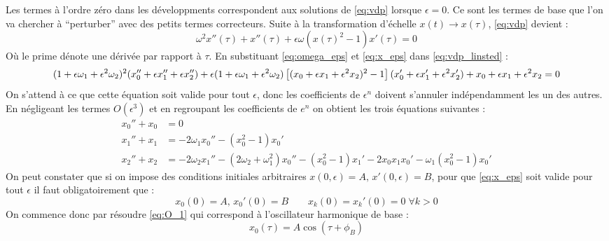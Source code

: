 %
Les termes à l’ordre zéro dans les développments correspondent aux solutions de \eqref{eq:vdp} lorsque $\epsilon = 0$.
Ce sont les termes de base que l’on va chercher à ``perturber” avec des petits termes correcteurs.
%
Suite à la transformation d'échelle $x(t) \to x(\tau)$, \eqref{eq:vdp} devient :
%
\begin{equation}
    \omega^2x''(\tau) + x''(\tau) + \epsilon\omega \left( x(\tau)^2 - 1 \right)x'(\tau) = 0
    \label{eq:vdp_linsted}
\end{equation}
%
Où le prime dénote une dérivée par rapport à $\tau$. En substituant \eqref{eq:omega_eps} et \eqref{eq:x_eps} dans \eqref{eq:vdp_linsted} :
%
\begin{dmath}
    (1+\epsilon\omega_1 + \epsilon^2\omega_2)^2(x_0'' + \epsilon x_1'' + \epsilon x_2'') + \epsilon(1+\epsilon\omega_1 + \epsilon^2\omega_2)\left[(x_0 + \epsilon x_1 + \epsilon^2 x_2)^2-1\right](x_0' + \epsilon x_1' + \epsilon^2 x_2') \\
    + {x_0 + \epsilon x_1 + \epsilon^2 x_2} = 0
\end{dmath}
%
On s’attend à ce que cette  équation soit valide pour tout $\epsilon$, donc les coefficients de $\epsilon^n$ doivent s’annuler indépendamment les un des autres. En négligeant les termes $O(\epsilon^3)$ et en regroupant les coefficients de $e^n$ on obtient les trois équations suivantes :
%
\begin{align}
    \label{eq:O_1}
    x_0'' + x_0 &= 0  \\
    \label{eq:O_eps}
    x_1'' + x_1 &= -2\omega_1 x_0'' - (x_0^2 - 1)x_0' \\
    \label{eq:O_eps2}
    x_2'' + x_2 &= -2\omega_2 x_1'' - (2\omega_2 + \omega_1^2)x_0'' - (x_0^2 - 1)x_1' - 2x_0 x_1 x_0' - \omega_1(x_0^2 - 1)x_0'
\end{align}
%
%
On peut constater que si on impose des conditions initiales arbitraires $x(0, \epsilon)=A,  \, x'(0, \epsilon)=B$, pour que \eqref{eq:x_eps} 
soit valide pour tout $\epsilon$ il faut obligatoirement que :
%
\begin{equation}
    x_0(0) = A,\, x_0'(0) = B
    \qquad
    x_k(0) = x_k'(0) = 0 \; \forall k > 0
\end{equation}
%
On commence donc par résoudre \eqref{eq:O_1} qui correspond à l'oscillateur harmonique de base :
%
\begin{equation}
    x_0(\tau) = A \cos(\tau + \phi_B)
\end{equation}
